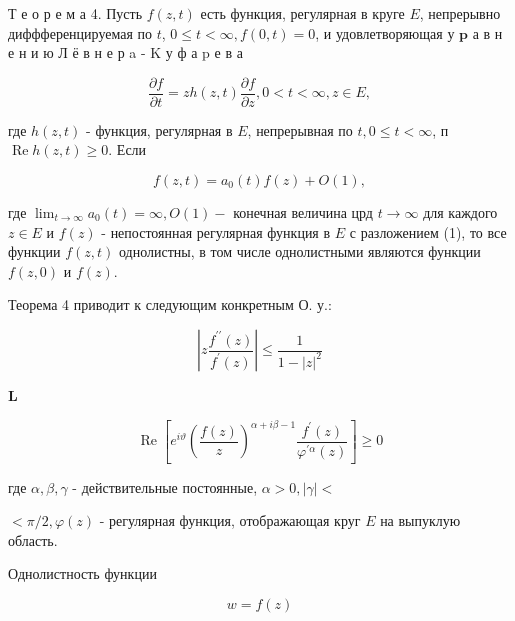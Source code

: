 \documentclass[10pt]{article}
\begin{document}
Т е о р е м а 4. Пусть $f(z, t)$ есть функция, регулярная в круге $E$, непрерывно диффференцируемая по $t$, $0 \leqslant t<\infty, f(0, t)=0$, и удовлетворяющая у $\mathbf{p}$ а в н е н и ю Л ё в н е р a - K у ф а p е в а



\[

\frac{\partial f}{\partial t}=z h(z, t) \frac{\partial f}{\partial z}, 0<t<\infty, z \in E,

\]



где $h(z, t)$ - функция, регулярная в $E$, непрерывная по $t, 0 \leqslant t<\infty$, п $\operatorname{Re} h(z, t) \geqslant 0$. Если



\[

f(z, t)=a_{0}(t) f(z)+O(1),

\]



где $\lim _{t \rightarrow \infty} a_{0}(t)=\infty, O(1)-$ конечная величина црд $t \rightarrow \infty$ для каждого $z \in E$ и $f(z)$ - непостоянная регулярная функция в $E$ с разложением (1), то все функции $f(z, t)$ однолистны, в том числе однолистными являются функции $f(z, 0)$ и $f(z)$.



Теорема 4 приводит к следующим конкретным О. у.:



\[

\left|z \frac{f^{\prime \prime}(z)}{f^{\prime}(z)}\right| \leqslant \frac{1}{1-|z|^{2}}

\]



$\mathbf{L}$



\[

\operatorname{Re}\left[e^{i \vartheta}\left(\frac{f(z)}{z}\right)^{\alpha+i \beta-1} \frac{f^{\prime}(z)}{\varphi^{\prime \alpha}(z)}\right] \geqslant 0

\]



где $\alpha, \beta, \gamma$ - действительные постоянные, $\alpha>0,|\gamma|<$

$<\pi / 2, \varphi(z)$ - регулярная функция, отображающая круг $E$ на выпуклую область.



Однолистность функции



\[

w=f(z)

\]
\end{document}
